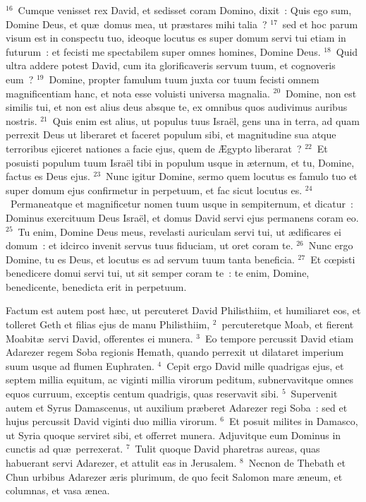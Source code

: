 ${}^{16}$~Cumque venisset rex David, et sedisset coram Domino, dixit~: Quis ego sum, Domine Deus, et qu\ae\ domus mea, ut pr\ae stares mihi talia~?
${}^{17}$~sed et hoc parum visum est in conspectu tuo, ideoque locutus es super domum servi tui etiam in futurum~: et fecisti me spectabilem super omnes homines, Domine Deus.
${}^{18}$~Quid ultra addere potest David, cum ita glorificaveris servum tuum, et cognoveris eum~?
${}^{19}$~Domine, propter famulum tuum juxta cor tuum fecisti omnem magnificentiam hanc, et nota esse voluisti universa magnalia.
${}^{20}$~Domine, non est similis tui, et non est alius deus absque te, ex omnibus quos audivimus auribus nostris.
${}^{21}$~Quis enim est alius, ut populus tuus Isra\"el, gens una in terra, ad quam perrexit Deus ut liberaret et faceret populum sibi, et magnitudine sua atque terroribus ejiceret nationes a facie ejus, quem de \AE gypto liberarat~?
${}^{22}$~Et posuisti populum tuum Isra\"el tibi in populum usque in \ae ternum, et tu, Domine, factus es Deus ejus.
${}^{23}$~Nunc igitur Domine, sermo quem locutus es famulo tuo et super domum ejus confirmetur in perpetuum, et fac sicut locutus es.
${}^{24}$~Permaneatque et magnificetur nomen tuum usque in sempiternum, et dicatur~: Dominus exercituum Deus Isra\"el, et domus David servi ejus permanens coram eo.
${}^{25}$~Tu enim, Domine Deus meus, revelasti auriculam servi tui, ut \ae dificares ei domum~: et idcirco invenit servus tuus fiduciam, ut oret coram te.
${}^{26}$~Nunc ergo Domine, tu es Deus, et locutus es ad servum tuum tanta beneficia.
${}^{27}$~Et cœpisti benedicere domui servi tui, ut sit semper coram te~: te enim, Domine, benedicente, benedicta erit in perpetuum.

\bchapter
\lettrine[lines=3,image=true,loversize=0.05,lraise=-0.03]{F}{}actum est autem post h\ae c, ut percuteret David Philisthiim, et humiliaret eos, et tolleret Geth et filias ejus de manu Philisthiim,
${}^{2}$~percuteretque Moab, et fierent Moabit\ae\ servi David, offerentes ei munera.
${}^{3}$~Eo tempore percussit David etiam Adarezer regem Soba regionis Hemath, quando perrexit ut dilataret imperium suum usque ad flumen Euphraten.
${}^{4}$~Cepit ergo David mille quadrigas ejus, et septem millia equitum, ac viginti millia virorum peditum, subnervavitque omnes equos curruum, exceptis centum quadrigis, quas reservavit sibi.
${}^{5}$~Supervenit autem et Syrus Damascenus, ut auxilium pr\ae beret Adarezer regi Soba~: sed et hujus percussit David viginti duo millia virorum.
${}^{6}$~Et posuit milites in Damasco, ut Syria quoque serviret sibi, et offerret munera. Adjuvitque eum Dominus in cunctis ad qu\ae\ perrexerat.
${}^{7}$~Tulit quoque David pharetras aureas, quas habuerant servi Adarezer, et attulit eas in Jerusalem.
${}^{8}$~Necnon de Thebath et Chun urbibus Adarezer \ae ris plurimum, de quo fecit Salomon mare \ae neum, et columnas, et vasa \ae nea.


